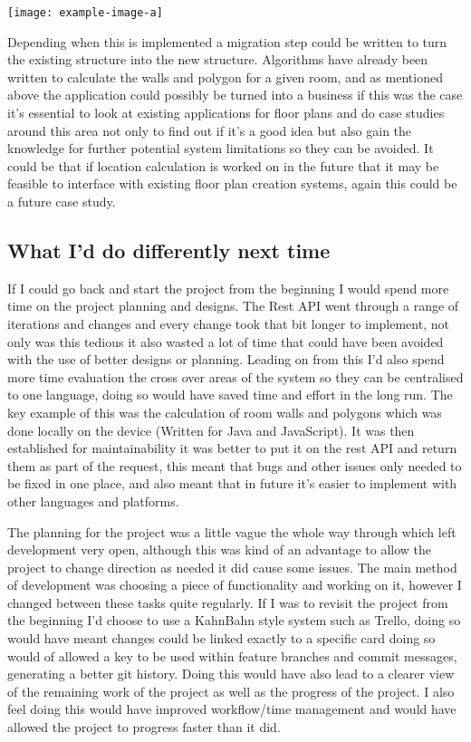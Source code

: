 \begin{center}
	\texttt{[image: example-image-a]}
\end{center}

Depending when this is implemented a migration step could be written to turn the existing structure into the new structure. Algorithms have already been written to calculate the walls and polygon for a given room, and as mentioned above the application could possibly be turned into a business if this was the case it's essential to look at existing applications for floor plans and do case studies around this area not only to find out if it's a good idea but also gain the knowledge for further potential system limitations so they can be avoided. It could be that if location calculation is worked on in the future that it may be feasible to interface with existing floor plan creation systems, again this could be a future case study.

\subsection{What I'd do differently next time}
If I could go back and start the project from the beginning I would spend more time on the project planning and designs. The Rest API went through a range of iterations and changes and every change took that bit longer to implement, not only was this tedious it also wasted a lot of time that could have been avoided with the use of better designs or planning. Leading on from this I'd also spend more time evaluation the cross over areas of the system so they can be centralised to one language, doing so would have saved time and effort in the long run. The key example of this was the calculation of room walls and polygons which was done locally on the device (Written for Java and JavaScript). It was then established for maintainability it was better to put it on the rest API and return them as part of the request, this meant that bugs and other issues only needed to be fixed in one place, and also meant that in future it's easier to implement with other languages and platforms.

The planning for the project was a little vague the whole way through which left development very open, although this was kind of an advantage to allow the project to change direction as needed it did cause some issues. The main method of development was choosing a piece of functionality and working on it, however I changed between these tasks quite regularly. If I was to revisit the project from the beginning I'd choose to use a KahnBahn style system such as Trello, doing so would have meant changes could be linked exactly to a specific card doing so would of allowed a key to be used within feature branches and commit messages, generating a better git history. Doing this would have also lead to a clearer view of the remaining work of the project as well as the progress of the project. I also feel doing this would have improved workflow/time management and would have allowed the project to progress faster than it did. 

